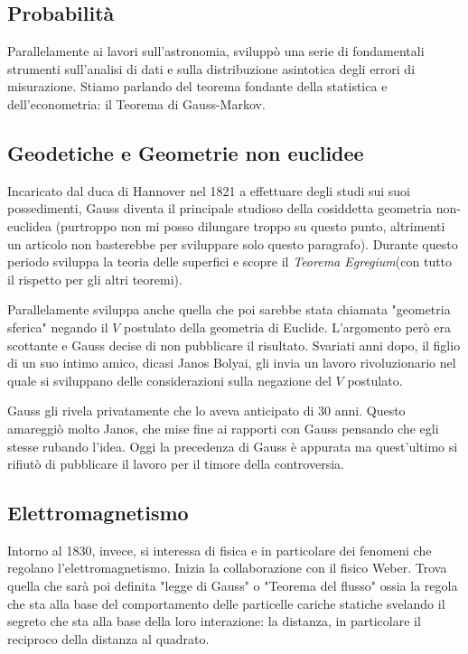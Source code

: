 \subsection{Probabilità}

Parallelamente ai lavori sull'astronomia, sviluppò una serie di fondamentali strumenti sull'analisi di dati e sulla distribuzione asintotica degli errori di misurazione. Stiamo parlando del teorema fondante della statistica e dell'econometria: il Teorema di Gauss-Markov.

\subsection{Geodetiche e Geometrie non euclidee}

Incaricato dal duca di Hannover nel 1821 a effettuare degli studi sui suoi possedimenti, Gauss diventa il principale studioso della cosiddetta geometria non-euclidea (purtroppo non mi posso dilungare troppo su questo punto, altrimenti un articolo non basterebbe per sviluppare solo questo paragrafo). Durante questo periodo sviluppa la teoria delle superfici e scopre il \emph{Teorema Egregium}(con tutto il rispetto per gli altri teoremi).

Parallelamente sviluppa anche quella che poi sarebbe stata chiamata "geometria sferica" negando il $ V $ postulato della geometria di Euclide. L'argomento però era scottante e Gauss decise di non pubblicare il risultato. Svariati anni dopo, il figlio di un suo intimo amico, dicasi Janos Bolyai, gli invia un lavoro rivoluzionario nel quale si sviluppano delle considerazioni sulla negazione del $ V $ postulato.

Gauss gli rivela privatamente che lo aveva anticipato di 30 anni. Questo amareggiò molto Janos, che mise fine ai rapporti con Gauss pensando che egli stesse rubando l'idea. Oggi la precedenza di Gauss è appurata ma quest'ultimo si rifiutò di pubblicare il lavoro per il timore della controversia.

\subsection{Elettromagnetismo}

Intorno al 1830, invece, si interessa di fisica e in particolare dei fenomeni che regolano l'elettromagnetismo. Inizia la collaborazione con il fisico Weber. Trova quella che sarà poi definita "legge di Gauss" o "Teorema del flusso" ossia la regola che sta alla base del comportamento delle particelle cariche statiche svelando il segreto che sta alla base della loro interazione: la distanza, in particolare il reciproco della distanza al quadrato.

